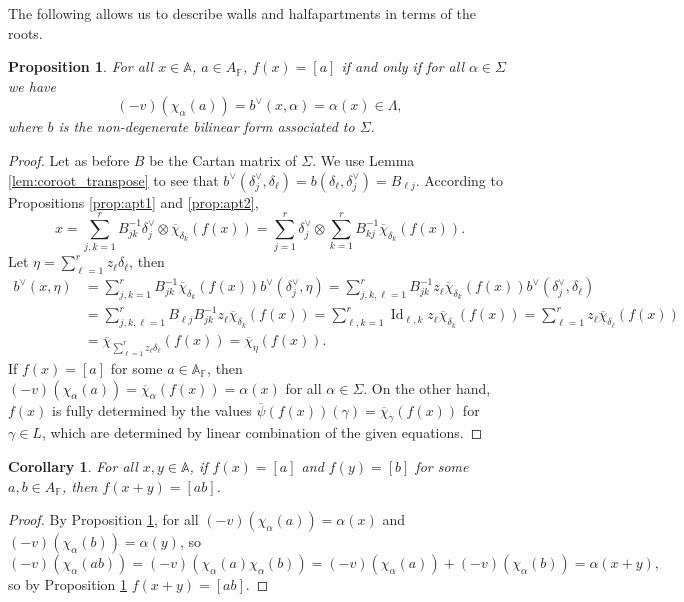 \documentclass[12pt]{amsart}
\newcommand{\F}{\mathbb{F} }
\newcommand{\A}{\mathbb{A}}
\numberwithin{equation}{section}
\newtheorem{proposition}[theorem]{Proposition}
\newtheorem{corollary}[theorem]{Corollary}
\theoremstyle{remark} %
\begin{document}
 The following allows us to describe walls and halfapartments in terms of the roots.
\begin{proposition}\label{prop:chi_f}
	For all $x \in \A$, $a\in A_\F$, $f(x) = [a]$ if and only if for all $\alpha \in \Sigma$ we have
	$$
	(-v)(\chi_{\alpha}(a)) = b^\vee(x, \alpha) = \alpha(x) \in \Lambda,
	$$
	where $b$ is the non-degenerate bilinear form associated to $\Sigma$.
\end{proposition}
\begin{proof}
	Let as before $B$ be the Cartan matrix of $\Sigma$. We use Lemma \ref{lem:coroot_transpose} to see that $b^\vee(\delta_j^\vee, \delta_\ell) = b(\delta_\ell, \delta_j^\vee) = B_{\ell j}$. According to Propositions \ref{prop:apt1} and \ref{prop:apt2},
	$$
	x = \sum_{j,k = 1}^r B_{jk}^{-1} \delta_j^\vee \otimes \overline{\chi}_{\delta_k}(f(x)) = \sum_{j=1}^r \delta_j^\vee \otimes \sum_{k=1}^r B_{kj}^{-1} \overline{\chi}_{\delta_k}(f(x)).
	$$ 
	Let $\eta = \sum_{\ell =1}^r z_\ell \delta_\ell$, then
	\begin{align*}
        b^\vee(x, \eta) 
        &= \sum_{j,k=1}^r B_{jk}^{-1} \overline{\chi}_{\delta_k}(f(x)) b^\vee(\delta_j^\vee, \eta) 
        =  \sum_{j,k,\ell =1}^r B_{jk}^{-1} z_\ell \overline{\chi}_{\delta_k}(f(x)) b^\vee(\delta_j^\vee,\delta_\ell) \\
        &=  \sum_{j,k,\ell =1}^r B_{\ell j} B_{jk}^{-1} z_\ell \overline{\chi}_{\delta_k}(f(x)) 
        = \sum_{\ell , k =1}^r \operatorname{Id}_{\ell,k} z_\ell \overline{\chi}_{\delta_k}(f(x)) 
        = \sum_{\ell = 1}^r z_\ell \overline{\chi}_{\delta_\ell}(f(x)) \\
        &= \overline{\chi}_{\sum_{\ell=1}^r z_\ell\delta_\ell }(f(x))
        = \overline{\chi}_\eta (f(x)).
	\end{align*}
If $f(x)=[a]$ for some $a\in \A_\F$, then $(-v)(\chi_\alpha(a)) = \overline{\chi}_\alpha(f(x)) = \alpha(x)$ for all $\alpha \in \Sigma$. On the other hand, $f(x)$ is fully determined by the values $\overline{\psi}(f(x))(\gamma) = \overline{\chi}_\gamma(f(x))$ for $\gamma \in L$, which are determined by linear combination of the given equations. 
\end{proof}
\begin{corollary}\label{cor:f_additive}
	For all $x,y \in \A$, if $f(x)= [a]$ and $f(y)=[b]$ for some $a , b\in A_\F$, then $f(x+y) = [ab]$.
\end{corollary}
\begin{proof}
	By Proposition \ref{prop:chi_f}, for all $(-v)(\chi_\alpha(a)) = \alpha(x)$ and $(-v)(\chi_\alpha(b))=\alpha(y)$, so
	$$
(-v)(\chi_\alpha(ab)) = (-v)(\chi_\alpha(a)\chi_\alpha(b)) = (-v)(\chi_\alpha(a)) + (-v)(\chi_\alpha(b)) = \alpha(x+y),
    $$
    so by Proposition \ref{prop:chi_f} $f(x+y) = [ab]$.
\end{proof}
\end{document}
